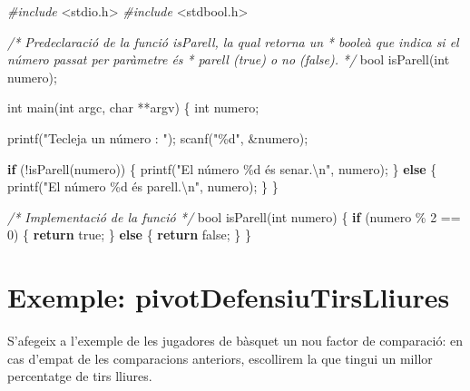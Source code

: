 \documentclass[
]{book}
\newenvironment{Shaded}{\begin{snugshade}}{\end{snugshade}}
\newcommand{\CommentTok}[1]{\textcolor[rgb]{0.56,0.35,0.01}{\textit{#1}}}
\newcommand{\ControlFlowTok}[1]{\textcolor[rgb]{0.13,0.29,0.53}{\textbf{#1}}}
\newcommand{\DataTypeTok}[1]{\textcolor[rgb]{0.13,0.29,0.53}{#1}}
\newcommand{\DecValTok}[1]{\textcolor[rgb]{0.00,0.00,0.81}{#1}}
\newcommand{\ImportTok}[1]{#1}
\newcommand{\NormalTok}[1]{#1}
\newcommand{\PreprocessorTok}[1]{\textcolor[rgb]{0.56,0.35,0.01}{\textit{#1}}}
\newcommand{\SpecialCharTok}[1]{\textcolor[rgb]{0.00,0.00,0.00}{#1}}
\newcommand{\StringTok}[1]{\textcolor[rgb]{0.31,0.60,0.02}{#1}}
\begin{document}
\begin{Shaded}
\begin{Highlighting}[]
\PreprocessorTok{\#include }\ImportTok{\textless{}stdio.h\textgreater{}}
\PreprocessorTok{\#include }\ImportTok{\textless{}stdbool.h\textgreater{}}

\CommentTok{/* Predeclaració de la funció isParell, la qual retorna un}
\CommentTok{ * booleà que indica si el número passat per paràmetre és}
\CommentTok{ * parell (true) o no (false). }
\CommentTok{ */}
\DataTypeTok{bool}\NormalTok{ isParell(}\DataTypeTok{int}\NormalTok{ numero);}

\DataTypeTok{int}\NormalTok{ main(}\DataTypeTok{int}\NormalTok{ argc, }\DataTypeTok{char}\NormalTok{ **argv) \{}
    \DataTypeTok{int}\NormalTok{ numero;}
    
\NormalTok{    printf(}\StringTok{"Tecleja un número : "}\NormalTok{);}
\NormalTok{    scanf(}\StringTok{"\%d"}\NormalTok{, \&numero);}

    \ControlFlowTok{if}\NormalTok{ (!isParell(numero)) \{}
\NormalTok{        printf(}\StringTok{"El número \%d és senar.}\SpecialCharTok{\textbackslash{}n}\StringTok{"}\NormalTok{, numero);}
\NormalTok{    \} }\ControlFlowTok{else}\NormalTok{ \{}
\NormalTok{        printf(}\StringTok{"El número \%d és parell.}\SpecialCharTok{\textbackslash{}n}\StringTok{"}\NormalTok{, numero);}
\NormalTok{    \}}
\NormalTok{\}}

\CommentTok{/* Implementació de la funció */}
\DataTypeTok{bool}\NormalTok{ isParell(}\DataTypeTok{int}\NormalTok{ numero) \{}
    \ControlFlowTok{if}\NormalTok{ (numero \% }\DecValTok{2}\NormalTok{ == }\DecValTok{0}\NormalTok{) \{}
        \ControlFlowTok{return}\NormalTok{ true;}
\NormalTok{    \} }\ControlFlowTok{else}\NormalTok{ \{}
        \ControlFlowTok{return}\NormalTok{ false;}
\NormalTok{    \}}
\NormalTok{\}}
\end{Highlighting}
\end{Shaded}

\hypertarget{exemple-pivotdefensiutirslliures}{%
\section{Exemple: pivotDefensiuTirsLliures}\label{exemple-pivotdefensiutirslliures}}

S'afegeix a l'exemple de les jugadores de bàsquet un nou factor de comparació: en cas d'empat de les comparacions anteriors, escollirem la que tingui un millor percentatge de tirs lliures.
\end{document}
